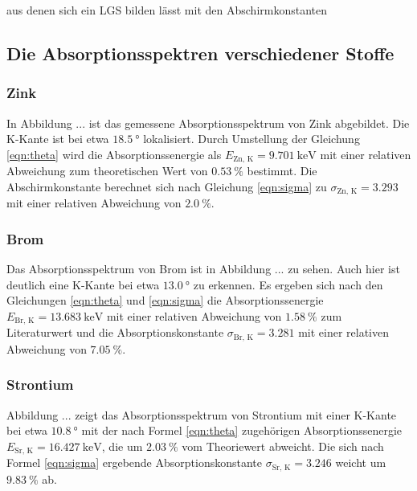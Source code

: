 aus denen sich ein LGS bilden lässt mit den Abschirmkonstanten


\subsection{Die Absorptionsspektren verschiedener Stoffe}

\subsubsection{Zink}

In Abbildung ... ist das gemessene Absorptionsspektrum von Zink abgebildet.
Die K-Kante ist bei etwa $\SI{18.5}{\degree}$ lokalisiert. Durch Umstellung 
der Gleichung \eqref{eqn:theta} wird die Absorptionssenergie als 
$ E_\text{Zn, K} = \SI{9.701}{\kilo\eV}$ mit einer relativen Abweichung
zum theoretischen Wert von $\SI{0.53}{\percent}$ bestimmt. Die Abschirmkonstante
berechnet sich nach Gleichung \eqref{eqn:sigma} zu $\sigma_\text{Zn, K} = 3.293$
mit einer relativen Abweichung von $\SI{2.0}{\percent}$.

\subsubsection{Brom}

Das Absorptionsspektrum von Brom ist in Abbildung ... zu sehen.
Auch hier ist deutlich eine K-Kante bei etwa $\SI{13.0}{\degree}$ zu erkennen.
Es ergeben sich nach den Gleichungen \eqref{eqn:theta} und \eqref{eqn:sigma}
die Absorptionssenergie $ E_\text{Br, K} = \SI{13.683}{\kilo\eV}$ mit einer 
relativen Abweichung von $\SI{1.58}{\percent}$ zum Literaturwert und die 
Absorptionskonstante $\sigma_\text{Br, K} = 3.281$ mit einer relativen
Abweichung von $\SI{7.05}{\percent}$.

\subsubsection{Strontium}

Abbildung ... zeigt das Absorptionsspektrum von Strontium mit einer 
K-Kante bei etwa $\SI{10.8}{\degree}$ mit der nach Formel \eqref{eqn:theta}
zugehörigen Absorptionssenergie $ E_\text{Sr, K} = \SI{16.427}{\kilo\eV}$,
die um $\SI{2.03}{\percent}$ vom Theoriewert abweicht. Die sich nach Formel 
\eqref{eqn:sigma} ergebende Absorptionskonstante $\sigma_\text{Sr, K} = 3.246$
weicht um $\SI{9.83}{\percent}$ ab.

